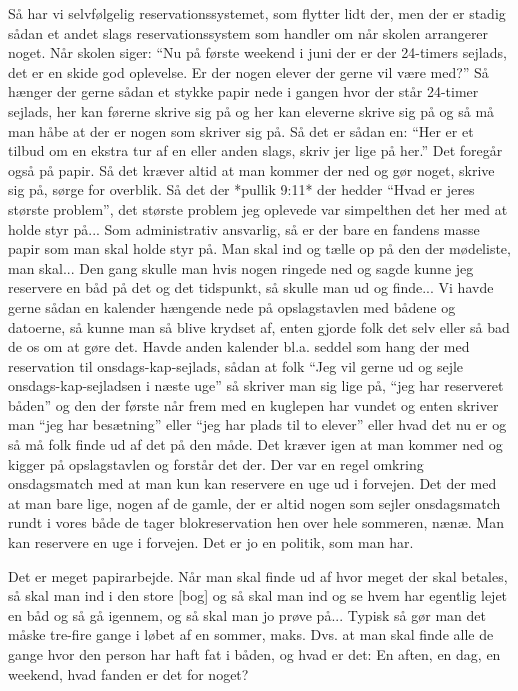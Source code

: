 Så har vi selvfølgelig reservationssystemet, som flytter lidt der, men der er stadig sådan et andet slags reservationssystem som handler om når skolen arrangerer noget. 
Når skolen siger: ``Nu på første weekend i juni der er der 24-timers sejlads, det er en skide god oplevelse. Er der nogen elever der gerne vil være med?'' Så hænger der gerne sådan et stykke papir nede i gangen hvor der står 24-timer sejlads, her kan førerne skrive sig på og her kan eleverne skrive sig på og så må man håbe at der er nogen som skriver sig på. 
Så det er sådan en: ``Her er et tilbud om en ekstra tur af en eller anden slags, skriv jer lige på her.'' 
Det foregår også på papir. 
Så det kræver altid at man kommer der ned og gør noget, skrive sig på, sørge for overblik. 
Så det der *pullik 9:11* der hedder ``Hvad er jeres største problem'', det største problem jeg oplevede var simpelthen det her med at holde styr på... 
Som administrativ ansvarlig, så er der bare en fandens masse papir som man skal holde styr på. Man skal ind og tælle op på den der mødeliste, man skal... 
Den gang skulle man hvis nogen ringede ned og sagde kunne jeg reservere en båd på det og det tidspunkt, så skulle man ud og finde... 
Vi havde gerne sådan en kalender hængende nede på opslagstavlen med bådene og datoerne, så kunne man så blive krydset af, enten gjorde folk det selv eller så bad de os om at gøre det. Havde anden kalender bl.a. seddel som hang der med reservation til onsdags-kap-sejlads, sådan at folk ``Jeg vil gerne ud og sejle onsdags-kap-sejladsen i næste uge'' så skriver man sig lige på, ``jeg har reserveret båden'' og den der første når frem med en kuglepen har vundet og enten skriver man ``jeg har besætning'' eller ``jeg har plads til to elever'' eller hvad det nu er og så må folk finde ud af det på den måde. 
Det kræver igen at man kommer ned og kigger på opslagstavlen og forstår det der. 
Der var en regel omkring onsdagsmatch med at man kun kan reservere en uge ud i forvejen. 
Det der med at man bare lige, nogen af de gamle, der er altid nogen som sejler onsdagsmatch rundt i vores både de tager blokreservation hen over hele sommeren, nænæ. 
Man kan reservere en uge i forvejen. 
Det er jo en politik, som man har. 

Det er meget papirarbejde. 
Når man skal finde ud af hvor meget der skal betales, så skal man ind i den store [bog] og så skal man ind og se hvem har egentlig lejet en båd og så gå igennem, og så skal man jo prøve på... 
Typisk så gør man det måske tre-fire gange i løbet af en sommer, maks. Dvs. at man skal finde alle de gange hvor den person har haft fat i båden, og hvad er det: En aften, en dag, en weekend, hvad fanden er det for noget? 

